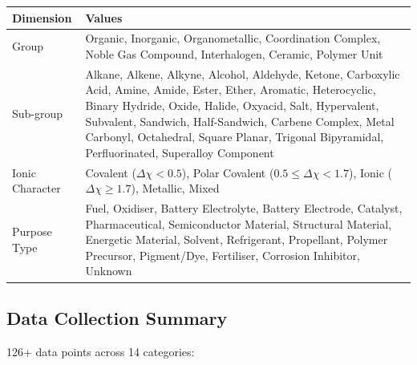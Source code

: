 \documentclass[11pt,a4paper]{article}
\begin{document}
\begin{center}
\begin{tabular}{lp{9cm}}
\toprule
\textbf{Dimension} & \textbf{Values} \\
\midrule
Group & Organic, Inorganic, Organometallic, Coordination Complex,
        Noble Gas Compound, Interhalogen, Ceramic, Polymer Unit \\
\addlinespace
Sub-group & Alkane, Alkene, Alkyne, Alcohol, Aldehyde, Ketone,
            Carboxylic Acid, Amine, Amide, Ester, Ether, Aromatic,
            Heterocyclic, Binary Hydride, Oxide, Halide, Oxyacid,
            Salt, Hypervalent, Subvalent, Sandwich, Half-Sandwich,
            Carbene Complex, Metal Carbonyl, Octahedral,
            Square Planar, Trigonal Bipyramidal, Perfluorinated,
            Superalloy Component \\
\addlinespace
Ionic Character & Covalent ($\Delta\chi < 0.5$),
                  Polar Covalent ($0.5 \leq \Delta\chi < 1.7$),
                  Ionic ($\Delta\chi \geq 1.7$),
                  Metallic, Mixed \\
\addlinespace
Purpose Type & Fuel, Oxidiser, Battery Electrolyte, Battery Electrode,
              Catalyst, Pharmaceutical, Semiconductor Material,
              Structural Material, Energetic Material, Solvent,
              Refrigerant, Propellant, Polymer Precursor, Pigment/Dye,
              Fertiliser, Corrosion Inhibitor, Unknown \\
\bottomrule
\end{tabular}
\end{center}

\subsection{Data Collection Summary}

126+ data points across 14 categories:
\end{document}
